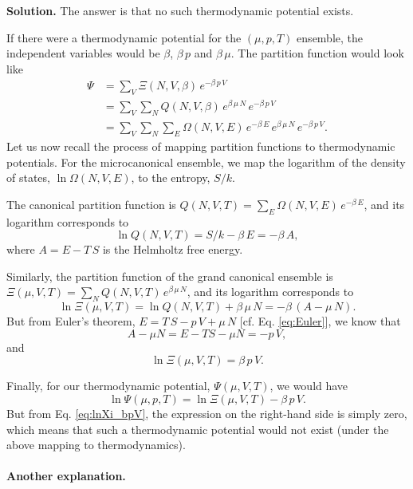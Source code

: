 \documentclass[twocolumn, 10pt]{article}
\numberwithin{equation}{section}
\newenvironment{solution}
{\par\medskip
  \textbf{Solution. }\ignorespaces}
{\medskip}
\begin{document}
\begin{solution}
The answer is that no such thermodynamic potential exists.

If there were a thermodynamic potential for the $(\mu, p, T)$ ensemble,
the independent variables would be $\beta$, $\beta \, p$ and $\beta \, \mu$.
%
The partition function would look like
\begin{align*}
  \Psi
  &=
  \sum_V \Xi(N, V, \beta) \, e^{-\beta \, p \, V}
  \\
  &=
  \sum_V \sum_N Q(N, V, \beta) \, e^{\beta \, \mu \, N} \, e^{-\beta \, p \, V}
  \\
  &=
  \sum_V \sum_N \sum_E \Omega(N, V, E) \, e^{-\beta \, E}
  \, e^{\beta \, \mu \, N} \, e^{-\beta \, p \, V}
  .
\end{align*}
%
Let us now recall the process of mapping
partition functions to thermodynamic potentials.
%
For the microcanonical ensemble,
we map the logarithm of the density of states,
$\ln \Omega(N, V, E)$,
to the entropy, $S/k$.

The canonical partition function is
$Q(N, V, T) = \sum_E \Omega(N, V, E) \, e^{-\beta \, E}$,
and its logarithm corresponds to
$$
\ln Q(N, V, T) = S/k - \beta \, E = -\beta \, A,
$$
where $A = E - T \, S$ is the Helmholtz free energy.

Similarly, the partition function
of the grand canonical ensemble is
$\Xi(\mu, V, T) = \sum_N Q(N, V, T) \, e^{\beta \, \mu \, N}$,
and its logarithm corresponds to
$$
\ln \Xi(\mu, V, T) = \ln Q(N, V, T) + \beta \, \mu \, N = -\beta \, (A - \mu \, N).
$$
But from Euler's theorem, $E = T \, S - p \, V + \mu \, N$
[cf. Eq. \eqref{eq:Euler}], we know that
$$
A - \mu N = E - T S - \mu N = -p \, V,
$$
and
\begin{equation}
  \ln \Xi(\mu, V, T) = \beta \, p \, V.
\label{eq:lnXi_bpV}
\end{equation}

Finally, for our thermodynamic potential, $\Psi(\mu, V, T)$,
we would have
$$
\ln \Psi(\mu, p, T) = \ln \Xi(\mu, V, T) - \beta \, p \, V.
$$
But from Eq. \eqref{eq:lnXi_bpV},
the expression on the right-hand side is simply zero,
which means that such a thermodynamic potential
would not exist (under the above mapping to thermodynamics).
\end{solution}

\paragraph*{Another explanation.}
\end{document}
